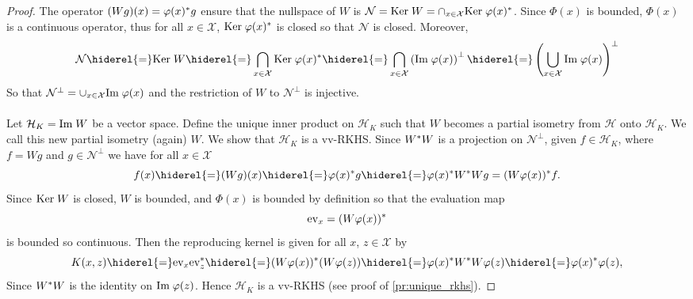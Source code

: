 \begin{proof} 
    The operator $(Wg)(x)=\Phi(x)^\adjoint g$ ensure that the nullspace of $W$
    is $\mathcal{N}=\Ker W=\cap_{x\in\mathcal{X}}\Ker \Phi(x)^\adjoint$. Since
    $\Phi(x)$ is bounded, $\Phi(x)$ is a continuous operator, thus for all
    $x\in\mathcal{X}$, $\Ker \Phi(x)^\adjoint$ is closed so that $\mathcal{N}$
    is closed. Moreover,
    \begin{dmath*}
        \mathcal{N}\hiderel{=}\Ker W\hiderel{=}\bigcap_{x\in\mathcal{X}}\Ker
        \Phi(x)^\adjoint\hiderel{=}\bigcap_{x\in\mathcal{X}}\left(\Ima
        \Phi(x)\right)^{\perp}\hiderel{=}\left(\bigcup_{x\in\mathcal{X}}\Ima
        \Phi(x)\right)^{\perp}
    \end{dmath*}
    So that $\mathcal{N}^\perp=\cup_{x\in\mathcal{X}}\Ima \Phi(x)$ and the
    restriction of $W$ to $\mathcal{N}^{\perp}$ is injective.
    \paragraph{}
    Let $\mathcal{H}_K=\text{Im}\; W$ be a vector space. Define the unique inner
    product on $\mathcal{H}_K$ such that $W$ becomes a partial isometry from
    $\mathcal{H}$ onto $\mathcal{H}_K$. We call this new partial isometry
    (again) $W$. We show that $\mathcal{H}_K$ is a \acl{vv-RKHS}. Since
    $W^* W$ is a projection on $\mathcal{N}^{\perp}$, given
    $f\in\mathcal{H}_K$, where $f=Wg$ and $g\in\mathcal{N}^{\perp}$ we have for
    all $x\in\mathcal{X}$
    \begin{dmath*}
        f(x) \hiderel{=} (Wg)(x)\hiderel{=}\Phi(x)^\adjoint
        g\hiderel{=}\Phi(x)^\adjoint W^\adjoint Wg=(W\Phi(x))^\adjoint f.
    \end{dmath*}
    Since $\text{Ker}\; W$ is closed, $W$ is bounded, and $\Phi(x)$ is bounded by
    definition so that the evaluation map
    \begin{dmath*}
        \text{ev}_x=(W\Phi(x))^\adjoint
    \end{dmath*}
    is bounded so continuous. Then the reproducing kernel is given for all $x$,
    $z\in\mathcal{X}$ by
    \begin{dmath*}
        K(x,z)\hiderel{=}\text{ev}_x\text{ev}_z^\adjoint
        \hiderel{=} (W\Phi(x))^\adjoint(W\Phi(z))
        \hiderel{=}\Phi(x)^\adjoint W^\adjoint W\Phi(z)
        \hiderel{=}\Phi(x)^\adjoint\Phi(z),
    \end{dmath*}
    Since $W^* W$ is the identity on $\Ima \Phi(z)$. Hence
    $\mathcal{H}_K$ is a \ac{vv-RKHS} (see proof of \cref{pr:unique_rkhs}).
\end{proof}
